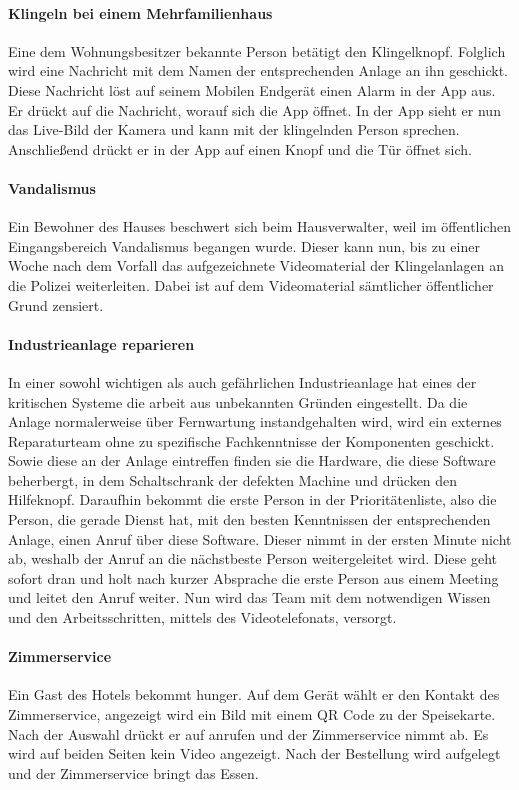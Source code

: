 \paragraph{\large{Klingeln bei einem Mehrfamilienhaus}}
    Eine dem Wohnungsbesitzer bekannte Person betätigt den Klingelknopf.
    Folglich wird eine Nachricht mit dem Namen der entsprechenden Anlage an ihn geschickt.
    Diese Nachricht löst auf seinem Mobilen Endgerät einen Alarm in der App aus.
    Er drückt auf die Nachricht, worauf sich die App öffnet.
    In der App sieht er nun das Live-Bild der Kamera und kann mit der klingelnden Person sprechen.
    Anschließend drückt er in der App auf einen Knopf und die Tür öffnet sich.

\paragraph{\large{Vandalismus}}
    Ein Bewohner des Hauses beschwert sich beim Hausverwalter, weil im öffentlichen Eingangsbereich Vandalismus begangen wurde.
    Dieser kann nun, bis zu einer Woche nach dem Vorfall das aufgezeichnete Videomaterial der Klingelanlagen an die Polizei weiterleiten.
    Dabei ist auf dem Videomaterial sämtlicher öffentlicher Grund zensiert.

\paragraph{\large{Industrieanlage reparieren}}
    In einer sowohl wichtigen als auch gefährlichen Industrieanlage hat eines der kritischen Systeme die arbeit aus unbekannten Gründen eingestellt.
    Da die Anlage normalerweise über Fernwartung instandgehalten wird, wird ein externes Reparaturteam ohne zu spezifische Fachkenntnisse der Komponenten geschickt.
    Sowie diese an der Anlage eintreffen finden sie die Hardware, die diese Software beherbergt, in dem Schaltschrank der defekten Machine und drücken den Hilfeknopf.
    Daraufhin bekommt die erste Person in der Prioritätenliste, also die Person, die gerade Dienst hat, mit den besten Kenntnissen der entsprechenden Anlage, einen Anruf über diese Software.
    Dieser nimmt in der ersten Minute nicht ab, weshalb der Anruf an die nächstbeste Person weitergeleitet wird.
    Diese geht sofort dran und holt nach kurzer Absprache die erste Person aus einem Meeting und leitet den Anruf weiter.
    Nun wird das Team mit dem notwendigen Wissen und den Arbeitsschritten, mittels des Videotelefonats, versorgt.

\paragraph{\large{Zimmerservice}}
    Ein Gast des Hotels bekommt hunger.
    Auf dem Gerät wählt er den Kontakt des Zimmerservice, angezeigt wird ein Bild mit einem QR Code zu der Speisekarte.
    Nach der Auswahl drückt er auf anrufen und der Zimmerservice nimmt ab.
    Es wird auf beiden Seiten kein Video angezeigt.
    Nach der Bestellung wird aufgelegt und der Zimmerservice bringt das Essen.
